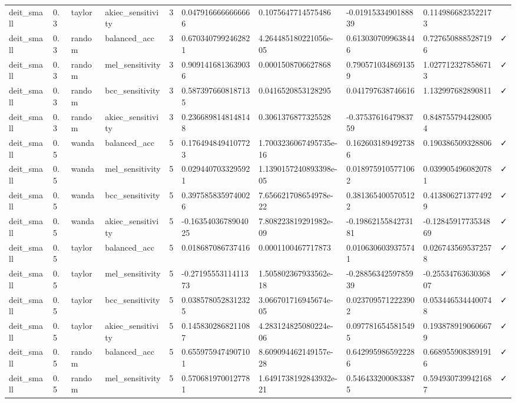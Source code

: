 \begin{table}[t]
\begin{tabular}{llllllllll}
deit\_small & 0.3 & taylor & akiec\_sensitivity & 3 & 0.0479166666666666 & 0.1075647714575486 & -0.0191533490188839 & 0.1149866823522173 &   \\
deit\_small & 0.3 & random & balanced\_acc & 3 & 0.6703407992462821 & 4.264485180221056e-05 & 0.6130307099638446 & 0.7276508885287196 & ✓ \\
deit\_small & 0.3 & random & mel\_sensitivity & 3 & 0.9091416813639036 & 0.0001508706627868 & 0.7905710348691359 & 1.0277123278586713 & ✓ \\
deit\_small & 0.3 & random & bcc\_sensitivity & 3 & 0.5873976608187135 & 0.0416520853128295 & 0.041797638746616 & 1.132997682890811 & ✓ \\
deit\_small & 0.3 & random & akiec\_sensitivity & 3 & 0.2366898148148148 & 0.3061376877325528 & -0.3753761647983759 & 0.8487557944280054 &   \\
deit\_small & 0.5 & wanda & balanced\_acc & 5 & 0.1764948494107723 & 1.7003236067495735e-16 & 0.1626031894927386 & 0.190386509328806 & ✓ \\
deit\_small & 0.5 & wanda & mel\_sensitivity & 5 & 0.0294407033295921 & 1.1390157240893398e-05 & 0.0189759105771062 & 0.0399054960820781 & ✓ \\
deit\_small & 0.5 & wanda & bcc\_sensitivity & 5 & 0.3975858359740026 & 7.656621708654978e-22 & 0.3813654005705122 & 0.4138062713774929 & ✓ \\
deit\_small & 0.5 & wanda & akiec\_sensitivity & 5 & -0.1635403678904025 & 7.808223819291982e-09 & -0.1986215584273181 & -0.1284591773534869 & ✓ \\
deit\_small & 0.5 & taylor & balanced\_acc & 5 & 0.018687086737416 & 0.0001100467717873 & 0.0106306039375741 & 0.0267435695372578 & ✓ \\
deit\_small & 0.5 & taylor & mel\_sensitivity & 5 & -0.2719555311411373 & 1.505802367933562e-18 & -0.2885634259785939 & -0.2553476363036807 & ✓ \\
deit\_small & 0.5 & taylor & bcc\_sensitivity & 5 & 0.0385780528312325 & 3.066701716945674e-05 & 0.0237095712223902 & 0.0534465344400748 & ✓ \\
deit\_small & 0.5 & taylor & akiec\_sensitivity & 5 & 0.1458302868211087 & 4.283124825080224e-06 & 0.0977816545815495 & 0.1938789190606679 & ✓ \\
deit\_small & 0.5 & random & balanced\_acc & 5 & 0.6559759474907101 & 8.609094462149157e-28 & 0.6429959865922286 & 0.6689559083891916 & ✓ \\
deit\_small & 0.5 & random & mel\_sensitivity & 5 & 0.5706819700127781 & 1.6491738192843932e-21 & 0.5464332000833875 & 0.5949307399421687 & ✓ \\

\end{tabular}
\end{table}
